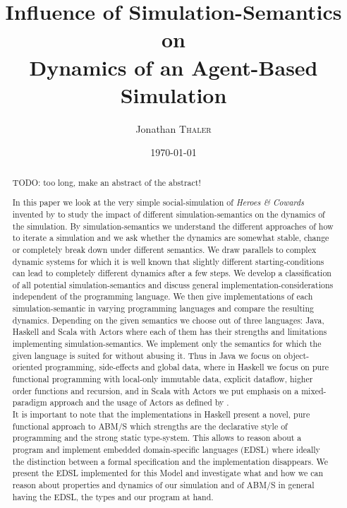 \documentclass{article}
\title{Influence of Simulation-Semantics on \\ Dynamics of an Agent-Based Simulation} %
\author{Jonathan \textsc{Thaler}} %
\date{\today} %
\begin{document}
\maketitle %

\begin{abstract}
TODO: too long, make an abstract of the abstract!

In this paper we look at the very simple social-simulation of \textit{Heroes \& Cowards} invented by \cite{wilensky_introduction_2015} to study the impact of different simulation-semantics on the dynamics of the simulation. By simulation-semantics we understand the different approaches of how to iterate a simulation and we ask whether the dynamics are somewhat stable, change or completely break down under different semantics. We draw parallels to complex dynamic systems for which it is well known that slightly different starting-conditions can lead to completely different dynamics after a few steps. We develop a classification of all potential simulation-semantics and discuss general implementation-considerations independent of the programming language. We then give implementations of each simulation-semantic in varying programming languages and compare the resulting dynamics. Depending on the given semantics we choose out of three languages: Java, Haskell and Scala with Actors where each of them has their strengths and limitations implementing simulation-semantics. We implement only the semantics for which the given language is suited for without abusing it. Thus in Java we focus on object-oriented programming, side-effects and global data, where in Haskell we focus on pure functional programming with local-only immutable data, explicit dataflow, higher order functions and recursion, and in Scala with Actors we put emphasis on a mixed-paradigm approach and the usage of Actors as defined by \cite{agha_actors:_1986}. \\
It is important to note that the implementations in Haskell present a novel, pure functional approach to ABM/S which strengths are the declarative style of programming and the strong static type-system. This allows to reason about a program and implement embedded domain-specific languages (EDSL) where ideally the distinction between a formal specification and the implementation disappears. We present the EDSL implemented for this Model and investigate what and how we can reason about properties and dynamics of our simulation and of ABM/S in general having the EDSL, the types and our program at hand. \\

\end{abstract}
\end{document}
